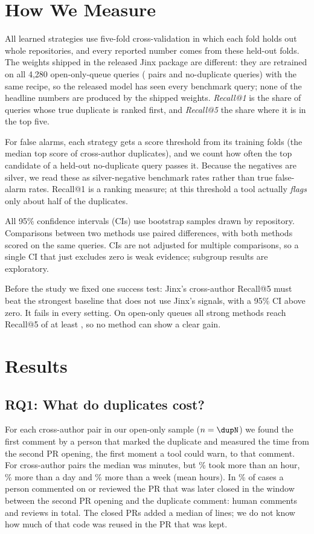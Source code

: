 \documentclass[10pt,conference]{IEEEtran}
\begin{document}
\section{How We Measure}
All learned strategies use five-fold cross-validation in which each fold holds out whole repositories, and every reported number comes from these held-out folds. The weights shipped in the released Jinx package are different: they are retrained on all 4{,}280 open-only-queue queries (\nPairs{} pairs and \haikuNegTotal{} no-duplicate queries) with the same recipe, so the released model has seen every benchmark query; none of the headline numbers are produced by the shipped weights. \emph{Recall@1} is the share of queries whose true duplicate is ranked first, and \emph{Recall@5} the share where it is in the top five.

For false alarms, each strategy gets a score threshold from its training folds (the median top score of cross-author duplicates), and we count how often the top candidate of a held-out no-duplicate query passes it. Because the negatives are silver, we read these as silver-negative benchmark rates rather than true false-alarm rates. Recall@1 is a ranking measure; at this threshold a tool actually \emph{flags} only about half of the duplicates.

All 95\% confidence intervals (CIs) use \nBoot{} bootstrap samples drawn by repository. Comparisons between two methods use paired differences, with both methods scored on the same queries. CIs are not adjusted for multiple comparisons, so a single CI that just excludes zero is weak evidence; subgroup results are exploratory.

Before the study we fixed one success test: Jinx's cross-author Recall@5 must beat the strongest baseline that does not use Jinx's signals, with a 95\% CI above zero. It fails in every setting. On open-only queues all strong methods reach Recall@5 of at least \RFiveintrude, so no method can show a clear gain.

\section{Results}
\subsection{RQ1: What do duplicates cost?}
For each cross-author pair in our open-only sample ($n=\dupN$) we found the first comment by a person that marked the duplicate and measured the time from the second PR opening, the first moment a tool could warn, to that comment. For cross-author pairs the median was \dupDelayMedMin{} minutes, but \dupLateOneH\% took more than an hour, \dupLateOneD\% more than a day and \dupLateSevenD\% more than a week (mean \dupDelayMeanH{} hours). In \dupEffort\% of cases a person commented on or reviewed the PR that was later closed in the window between the second PR opening and the duplicate comment: \dupComments{} human comments and \dupReviews{} reviews in total. The closed PRs added a median of \dupLinesMed{} lines; we do not know how much of that code was reused in the PR that was kept.
\end{document}
